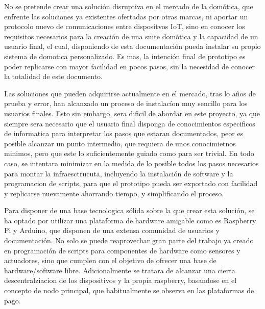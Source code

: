 No se pretende crear una solución disruptiva en el mercado de la domótica, que enfrente las soluciones ya existentes ofertadas por otras marcas, ni aportar un protocolo nuevo de comunicaciones entre dispositvos IoT, sino en conocer los requisitos necesarios para la creación de una suite domótica y la capacidad de un usuario final, el cual, disponiendo de esta documentación pueda instalar su propio sistema de domotica personalizado. Es mas, la intención final de prototipo es poder replicarse con mayor facilidad en pocos pasos, sin la necesidad de conocer la totalidad de este documento.

Las soluciones que pueden adquirirse actualmente en el mercado, tras lo años de prueba y error, han alcanzado un proceso de instalacíon muy sencillo para los usuarios finales. Esto sin embargo, sera dificil  de abordar en este proyecto, ya que siempre sera necesario que el usuario final disponga de conocimientos especificos de informatica para interpretar los pasos que estaran documentados, peor es posible alcanzar un punto intermedio, que requiera de unos conocimietnos minimos, pero que este lo suficientemente guiado como para ser trivial. En todo caso, se intentara minimizar en la medida de lo posible todos los pasos necesarios para montar la infraesctrucuta, incluyendo la instalación de software y la programacion de scripts, para que el prototipo pueda ser exportado con facilidad y replicarse nuevamente ahorrando tiempo, y simplificando el proceso.

Para disponer de una base tecnologica sólida sobre la que crear esta solución, se ha optado por utilizar una plataforma de hardware amigable como es Raspberry Pi y Arduino, que disponen de una extensa comunidad de usuarios y documentación. No solo se puede reaprovechar gran parte del trabajo ya creado en programación de scripts para componentes de hardware como sensores  y actuadores, sino que cumplen con el objetivo de ofrecer una base de hardware/software libre. Adicionalmente se tratara de alcanzar una cierta descentralziacion de los dispositivos y la propia raspberry, basandose en el concepto de nodo principal, que habitualmente se observa en las plataformas de pago.

